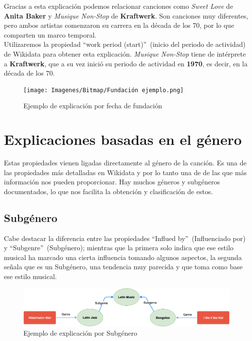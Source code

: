 Gracias a esta explicación podemos relacionar canciones como \textit{Sweet Love} de \textbf{Anita Baker} y \textit{Musique Non-Stop} de \textbf{Kraftwerk}. Son canciones muy diferentes, pero ambos artistas comenzaron su carrera en la década de los 70, por lo que comparten un marco temporal.\\

Utilizaremos la propiedad ``work period (start)''~(inicio del periodo de actividad) de Wikidata para obtener esta explicación. \textit{Musique Non-Stop} tiene de intérprete a \textbf{Kraftwerk}, que a su vez inició su periodo de actividad en \textbf{1970}, es decir, en la década de los 70.\\

\begin{figure}[h!]
	\centering
	\texttt{[image: Imagenes/Bitmap/Fundación ejemplo.png]}
	\caption{Ejemplo de explicación por fecha de fundación}
	\label{fig:sampleImage}
\end{figure}

\section{Explicaciones basadas en el género}

Estas propiedades vienen ligadas directamente al género de la canción. Es una de las propiedades más detalladas en Wikidata y por lo tanto una de de las que más información nos pueden proporcionar. Hay muchos géneros y subgéneros documentados, lo que nos facilita la obtención y clasificación de estos.\\

\subsection{Subgénero}

Cabe destacar la diferencia entre las propiedades ``Influed by''~(Influenciado por) y ``Subgenre''~(Subgénero); mientras que la primera solo indica que ese estilo musical ha marcado una cierta influencia tomando algunos aspectos, la segunda señala que es un Subgénero, una tendencia muy parecida y que toma como base ese estilo musical.\\

\begin{figure}[h!]
	\centering
	\includegraphics[width = 1\textwidth]{Imagenes/Bitmap/Subgenre.png}
	\caption{Ejemplo de explicación por Subgénero}
	\label{fig:sampleImage}
\end{figure}


